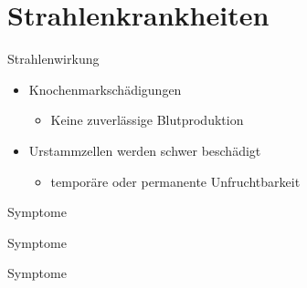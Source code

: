 \section{Strahlenkrankheiten}
\begin{frame}{Strahlenwirkung}
	\begin{itemize}
		\item Knochenmarkschädigungen
		\begin{itemize}
			\item[\Rightarrow] Keine zuverlässige Blutproduktion
		\end{itemize}
		\item Urstammzellen werden schwer beschädigt
		\begin{itemize}
			\item[\Rightarrow] temporäre oder permanente Unfruchtbarkeit
		\end{itemize}
	\end{itemize}
\end{frame}
\begin{frame}{Symptome}
	
\end{frame}
\begin{frame}{Symptome}
	
\end{frame}
\begin{frame}{Symptome}
	
\end{frame}
